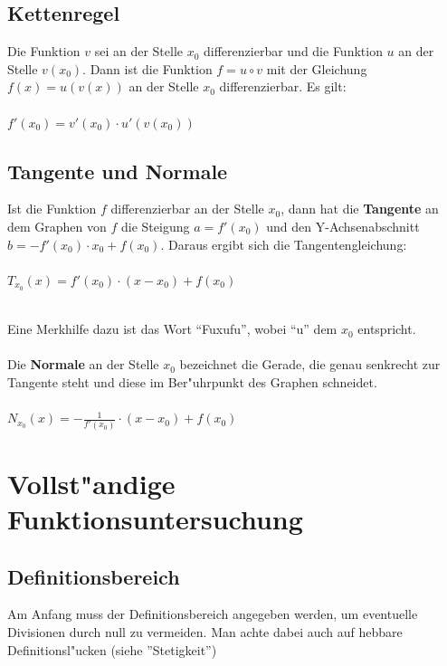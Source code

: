 \subsection{Kettenregel}
\begin{Definition}
Die Funktion $v$ sei an der Stelle $x_{0}$ differenzierbar und die Funktion $u$ an der Stelle $v(x_{0})$. Dann ist die Funktion $f=u\circ v$ mit der Gleichung $f(x)= u(v(x))$ an der Stelle $x_{0}$ differenzierbar. Es gilt:\\
\\
$f'(x_{0})=v'(x_{0})\cdot u'(v(x_{0}))$
\end{Definition}

\subsection{Tangente und Normale}
\begin{Definition}
Ist die Funktion $f$ differenzierbar an der Stelle $x_{0}$, dann hat die \textbf{Tangente} an dem Graphen von $f$ die Steigung $a=f'(x_{0})$ und den Y-Achsenabschnitt $b=-f'(x_{0})\cdot x_{0}+f(x_{0})$. Daraus ergibt sich die Tangentengleichung:\\
\\
$T_{x_{0}}(x)=f'(x_{0})\cdot (x-x_{0})+f(x_{0}) $ \\
\end{Definition}
\\
Eine Merkhilfe dazu ist das Wort "`Fuxufu"', wobei "`u"' dem $x_{0}$ entspricht.\\
\\
Die \textbf{Normale} an der Stelle $x_{0}$ bezeichnet die Gerade, die genau senkrecht zur Tangente steht und diese im Ber"uhrpunkt des Graphen schneidet.\\
\\
$N_{x_{0}}(x)=-\frac{1}{f'(x_{0})}\cdot (x-x_{0})+f(x_{0})$\\


\section{Vollst"andige Funktionsuntersuchung}


\subsection{Definitionsbereich}

Am Anfang muss der Definitionsbereich angegeben werden, um eventuelle Divisionen durch null zu vermeiden. Man achte dabei auch auf hebbare Definitionsl"ucken (siehe ''Stetigkeit'') \\


